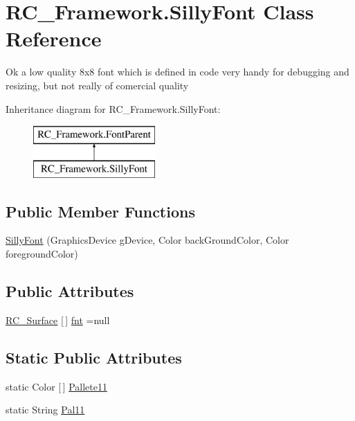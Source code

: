 \hypertarget{class_r_c___framework_1_1_silly_font}{}\section{R\+C\+\_\+\+Framework.\+Silly\+Font Class Reference}
\label{class_r_c___framework_1_1_silly_font}


Ok a low quality 8x8 font which is defined in code very handy for debugging and resizing, but not really of comercial quality  


Inheritance diagram for R\+C\+\_\+\+Framework.\+Silly\+Font\+:\begin{figure}[H]
\begin{center}
\leavevmode
\includegraphics[height=2.000000cm]{class_r_c___framework_1_1_silly_font}
\end{center}
\end{figure}
\subsection*{Public Member Functions}
\begin{DoxyCompactItemize}
\item 
\mbox{\hyperlink{class_r_c___framework_1_1_silly_font_a72496d4a4a8b21d77edcf2c1b50587cb}{Silly\+Font}} (Graphics\+Device g\+Device, Color back\+Ground\+Color, Color foreground\+Color)
\end{DoxyCompactItemize}
\subsection*{Public Attributes}
\begin{DoxyCompactItemize}
\item 
\mbox{\hyperlink{class_r_c___framework_1_1_r_c___surface}{R\+C\+\_\+\+Surface}} \mbox{[}$\,$\mbox{]} \mbox{\hyperlink{class_r_c___framework_1_1_silly_font_a9537d47e675c0bc00bdd024666afeb9f}{fnt}} =null
\end{DoxyCompactItemize}
\subsection*{Static Public Attributes}
\begin{DoxyCompactItemize}
\item 
static Color \mbox{[}$\,$\mbox{]} \mbox{\hyperlink{class_r_c___framework_1_1_silly_font_acc43dfc99e4db0923967255bb1fbd02f}{Pallete11}}
\item 
static String \mbox{\hyperlink{class_r_c___framework_1_1_silly_font_a3ee61138b396e76502ed9783517712c5}{Pal11}}
\end{DoxyCompactItemize}


